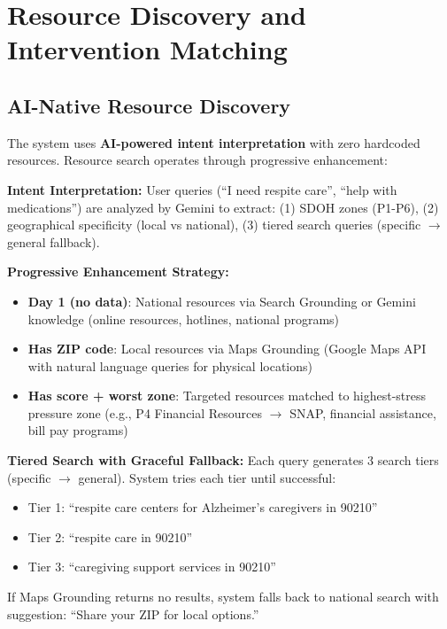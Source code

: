 \documentclass{article}
\begin{document}
\section{Resource Discovery and Intervention Matching}%
\label{sec:InterventionMatching}%
%
\subsection{AI-Native Resource Discovery}%
\label{subsec:CurrentInterventionImplementation}%
The system uses \textbf{AI-powered intent interpretation} with zero hardcoded resources. Resource search operates through progressive enhancement:

\textbf{Intent Interpretation:} User queries (``I need respite care'', ``help with medications'') are analyzed by Gemini to extract: (1) SDOH zones (P1-P6), (2) geographical specificity (local vs national), (3) tiered search queries (specific $\rightarrow$ general fallback).

\textbf{Progressive Enhancement Strategy:}
\begin{itemize}
    \item \textbf{Day 1 (no data)}: National resources via Search Grounding or Gemini knowledge (online resources, hotlines, national programs)
    \item \textbf{Has ZIP code}: Local resources via Maps Grounding (Google Maps API with natural language queries for physical locations)
    \item \textbf{Has score + worst zone}: Targeted resources matched to highest-stress pressure zone (e.g., P4 Financial Resources $\rightarrow$ SNAP, financial assistance, bill pay programs)
\end{itemize}

\textbf{Tiered Search with Graceful Fallback:} Each query generates 3 search tiers (specific $\rightarrow$ general). System tries each tier until successful:
\begin{itemize}
    \item Tier 1: ``respite care centers for Alzheimer's caregivers in 90210''
    \item Tier 2: ``respite care in 90210''
    \item Tier 3: ``caregiving support services in 90210''
\end{itemize}

If Maps Grounding returns no results, system falls back to national search with suggestion: ``Share your ZIP for local options.''
\end{document}
